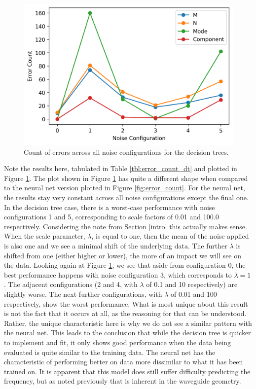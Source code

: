 \documentclass[conference]{IEEEtran}
\begin{document}
\begin{figure}
	\centering
	\includegraphics[width=1\linewidth]{images/error_count_dt}
	\caption{Count of errors across all noise configurations for the decision trees.}
	\label{fig:error_count_dt}
\end{figure}

Note the results here, tabulated in Table \ref{tbl:error_count_dt} and plotted in Figure \ref{fig:error_count_dt}. 
The plot shown in Figure \ref{fig:error_count_dt} has quite a different shape when compared to the neural net version plotted in Figure \ref{fig:error_count}.
For the neural net, the results stay very constant across all noise configurations except the final one.
In the decision tree case, there is a worst-case performance with noise configurations 1 and 5, corresponding to scale factors of 0.01 and 100.0 respectively.
Considering the note from Section \ref{intro} this actually makes sense. 
When the scale parameter, $\lambda$, is equal to one, then the mean of the noise applied is also one and we see a minimal shift of the underlying data.
The further $\lambda$ is shifted from one (either higher or lower), the more of an impact we will see on the data.
Looking again at Figure \ref{fig:error_count_dt}, we see that aside from configuration 0, the best performance happens with noise configuration 3, which corresponds to $\lambda = 1$. 
The adjacent configurations (2 and 4, with $\lambda$ of 0.1 and 10 respectively) are slightly worse. The next further configurations, with $\lambda$ of 0.01 and 100 respectively, show the worst performance.
What is most unique about this result is not the fact that it occurs at all, as the reasoning for that can be understood.
Rather, the unique characteristic here is why we do not see a similar pattern with the neural net. 
This leads to the conclusion that while the decision tree is quicker to implement and fit, it only shows good performance when the data being evaluated is quite similar to the training data.
The neural net has the characteristic of performing better on data more dissimilar to what it has been trained on.
It is apparent that this model does still suffer difficulty predicting the frequency, but as noted previously that is inherent in the waveguide geometry.
\end{document}
